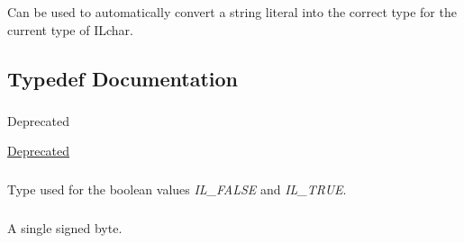 Can be used to automatically convert a string literal into the correct type for the current type of I\+Lchar. 



\subsection{Typedef Documentation}
\hypertarget{group__il__types_gae47e67f5430ba6989eaaf6b9a3bc8e87}{
\subsubsection[{I\+Lbitfield}]{}}\label{group__il__types_gae47e67f5430ba6989eaaf6b9a3bc8e87}
\begin{DoxyRefDesc}{Deprecated}
\item[\hyperlink{deprecated__deprecated000001}{Deprecated}]\end{DoxyRefDesc}
\hypertarget{group__il__types_gaa6aa7c95cfdc06b4d8601ef832b7bb0a}{
\subsubsection[{I\+Lboolean}]{}}\label{group__il__types_gaa6aa7c95cfdc06b4d8601ef832b7bb0a}


Type used for the boolean values {\itshape I\+L\+\_\+\+F\+A\+L\+S\+E} and {\itshape I\+L\+\_\+\+T\+R\+U\+E}. 

\hypertarget{group__il__types_gae50de507653746ec058ac59a453456b6}{
\subsubsection[{I\+Lbyte}]{}}\label{group__il__types_gae50de507653746ec058ac59a453456b6}


A single signed byte. 

\hypertarget{group__il__types_gabb6e047662a2e8131c5bcd785c84ff02}{
\subsubsection[{I\+Lchar}]{}}\label{group__il__types_gabb6e047662a2e8131c5bcd785c84ff02}


